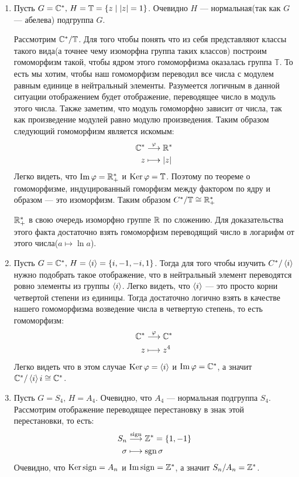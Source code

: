 \documentclass[../main.tex]{subfiles}
\begin{document}
\begin{examples}
  \begin{enumerate}
    \item Пусть $G = \mathbb{C}^{*}, \, H = \mathbb{T} = \{z \; | \; |z| = 1\}$. Очевидно $H$ --- нормальная(так как $G$ --- абелева) подгруппа $G$.

    Рассмотрим $\mathbb{C}^{*} / \mathbb{T}$. Для того чтобы понять что из себя представляют классы такого вида(а точнее чему изоморфна группа таких классов) построим гомоморфизм такой, чтобы ядром этого гомоморфизма оказалась группа $\mathbb{T}$. То есть мы хотим, чтобы наш гомоморфизм переводил все числа с модулем равным единице в нейтральный элементы. Разумеется логичным в данной ситуации отображением будет отображение, переводящее число в модуль этого числа. Также заметим, что модуль гомоморфно зависит от числа, так как произведение модулей равно модулю произведения. Таким образом следующий гомоморфизм является искомым:
    \begin{align*}
      \mathbb{C}^{*} &\overset{\varphi}{\longrightarrow} \mathbb{R}^{*} \\
      z &\longmapsto |z|
    \end{align*}
  Легко видеть, что $\operatorname{Im} \varphi = \mathbb{R}_{+}^{*}$ и $\operatorname{Ker} \varphi = \mathbb{T}$. Поэтому по теореме о гомоморфизме, индуцированный гоморфизм между фактором по ядру и образом --- это изоморфизм. Таким образом $C^{*} / \mathbb{T} \cong \mathbb{R}_{+}^{*}$
  \begin{remark}
    $\mathbb{R}_{+}^{*}$ в свою очередь изоморфно группе $\mathbb{R}$ по сложению. Для доказательства этого факта достаточно взять гомоморфизм переводящий число в логарифм от этого числа($a \mapsto \ln a$).
  \end{remark}

  \item Пусть $G = \mathbb{C}^{*}, \, H = \left\langle i \right\rangle = \{i, -1, -i, 1\}$. Тогда для того чтобы изучить $C^{*} / \left\langle i \right\rangle$ нужно подобрать такое отображение, что в нейтральный элемент переводятся ровно элементы из группы $\left\langle i \right\rangle$. Легко видеть, что $\left\langle i \right\rangle$ --- это просто корни четвертой степени из единицы. Тогда достаточно логично взять в качестве нашего гомоморфизма возведение числа в четвертую степень, то есть гомоморфизм:
    \begin{align*}
      \mathbb{C}^{*} &\overset{\varphi}{\longrightarrow} \mathbb{C}^{*} \\
      z &\longmapsto z^4
    \end{align*}
    Легко видеть что в этом случае $\operatorname{Ker} \varphi = \left\langle i \right\rangle$ и $\operatorname{Im} \varphi = \mathbb{C}^{*}$, а значит $\mathbb{C}^{*}/\left\langle i \right\rangle i \cong \mathbb{C}^{*}$.

  \item Пусть $G = S_4, \, H = A_4$. Очевидно, что $A_4$ --- нормальная подгруппа $S_4$. Рассмотрим отображение переводящее перестановку в знак этой перестановки, то есть:
    \begin{align*}
      S_n &\overset{\operatorname{sign}}{\longrightarrow} \mathbb{Z}^{*} = \{1, -1\} \\
      \sigma &\longmapsto \operatorname{sgn} \sigma
    \end{align*}
  Очевидно, что $\operatorname{Ker} \operatorname{sign} = A_n$ и $\operatorname{Im} \operatorname{sign} = \mathbb{Z}^{*}$, а значит $S_n/A_n = \mathbb{Z}^{*}$.
  \end{enumerate}
\end{examples}
\end{document}
